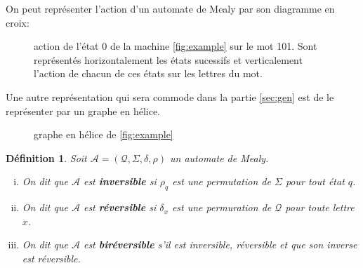 \documentclass[11pt,a4paper]{article}
\newtheorem{definition}{Définition}
\begin{document}
On peut représenter l'action d'un automate de Mealy par son diagramme en croix:

\begin{figure}[h]
  \begin{center}
    \caption{action de l'état 0 de la machine \ref{fig:example} sur le mot 101. Sont représentés horizontalement les états sucessifs et verticalement l'action de chacun de ces états sur les lettres du mot.}
  \end{center}
\end{figure}

Une autre représentation qui sera commode dans la partie \ref{sec:gen} est de le représenter par un graphe en hélice.

\begin{figure}[h]
  \begin{center}
    \caption{graphe en hélice de \ref{fig:example}}
  \end{center}
\end{figure}

\begin{definition}
  Soit $\mathcal{A}=\left(\mathcal{Q}, \Sigma, \delta, \rho\right)$ un automate de Mealy.
  \begin{enumerate}[(i)]
  \item On dit que $\mathcal{A}$ est \textbf{inversible} si $\rho_q$ est une permutation de $\Sigma$ pour tout état $q$.
  \item On dit que $\mathcal{A}$ est \textbf{réversible} si $\delta_x$ est une permuration de $\mathcal{Q}$ pour toute lettre $x$.
  \item On dit que $\mathcal{A}$ est \textbf{biréversible} s'il est inversible, réversible et que son inverse est réversible.
  \end{enumerate}
\end{definition}
\end{document}
